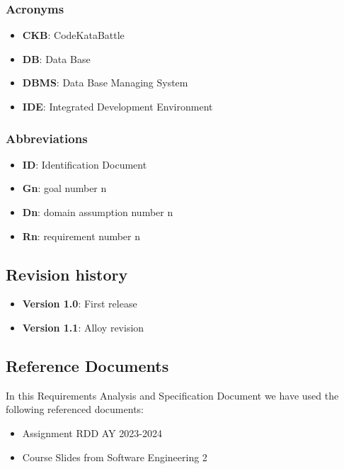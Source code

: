 \documentclass[12pt,oneside,a4paper]{article}
\begin{document}
\subsubsection{Acronyms}
\begin{itemize}
    \item \textbf{CKB}: CodeKataBattle
    \item \textbf{DB}: Data Base
    \item \textbf{DBMS}: Data Base Managing System
    \item \textbf{IDE}: Integrated Development Environment
\end{itemize}
\subsubsection{Abbreviations}
\begin{itemize}
    \item \textbf{ID}: Identification Document
    \item \textbf{Gn}: goal number n
    \item \textbf{Dn}: domain assumption number n
    \item \textbf{Rn}: requirement number n
\end{itemize}
\subsection{Revision history}
\begin{itemize}
    \item \textbf{Version 1.0}: First release
    \item \textbf{Version 1.1}: Alloy revision
\end{itemize}

\subsection{Reference Documents}
In this Requirements Analysis and Specification Document we have used the following referenced documents:

\begin{itemize}
    \item Assignment RDD AY 2023-2024
    \item Course Slides from Software Engineering 2
\end{itemize}
\end{document}
